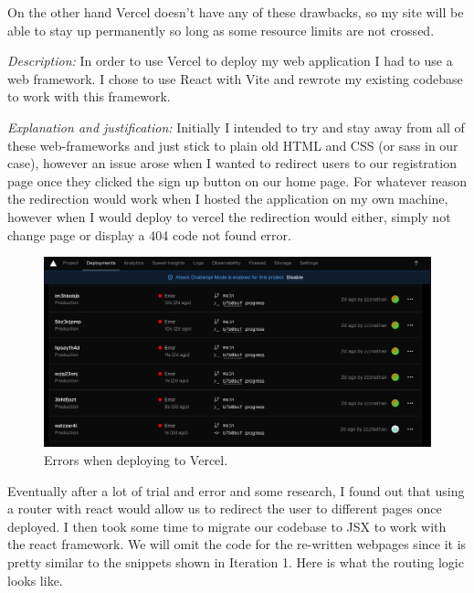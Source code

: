 On the other hand Vercel doesn't have any of these drawbacks, so my
site will be able to stay up permanently so long as some resource limits are
not crossed. \\ \vspace{0.2cm}

\textit{Description:} In order to use Vercel to deploy my web
application I had to use a web framework. I chose to use React with
Vite and rewrote my existing codebase to work with this framework. \\
\vspace{0.2cm}

\textit{Explanation and justification:}
Initially I intended to try and stay away from all of these
web-frameworks and just stick to plain old HTML and CSS (or
sass in our case), however an issue arose when I wanted to
redirect users to our registration page once they clicked
the sign up button on our home page. For whatever reason
the redirection would work when I hosted the application on
my own machine, however when I would deploy to vercel the
redirection would either, simply not change page or display
a 404 code not found error.

\begin{figure}[h]
\centering

\includegraphics[scale=0.2]{Images/Vercel_Errors.png}

\caption{Errors when deploying to Vercel.}

\end{figure}

Eventually after a lot of trial and error and some research,
I found out that using a router with react would allow us to
redirect the user to different pages once deployed. I then
took some time to migrate our codebase to JSX to work with the
react framework. We will omit the code for the re-written
webpages since it is pretty similar to the snippets shown in
Iteration 1. Here is what the routing logic looks like. \\
\vspace{0.2cm}

